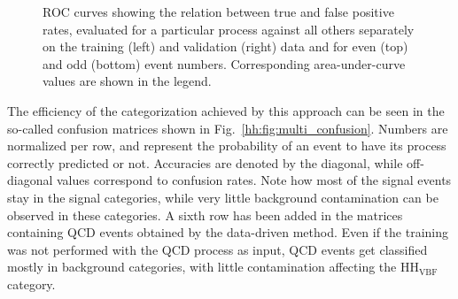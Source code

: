 \documentclass[../main.tex]{subfiles}
\begin{document}
\begin{figure}[h!]
\begin{center}
\end{center}
\caption[Multi-class ROC curves]{ROC curves showing the relation between true and false positive rates, evaluated for a particular process against all others separately on the training (left) and validation (right) data and for even (top) and odd (bottom) event numbers. Corresponding area-under-curve values are shown in the legend.}
\label{hh:fig:multi_roc}
\end{figure}

The efficiency of the categorization achieved by this approach can be seen in the so-called confusion matrices shown in Fig.~\ref{hh:fig:multi_confusion}. Numbers are normalized per row, and represent the probability of an event to have its process correctly predicted or not. Accuracies are denoted by the diagonal, while off-diagonal values correspond to confusion rates. Note how most of the signal events stay in the signal categories, while very little background contamination can be observed in these categories. A sixth row has been added in the matrices containing QCD events obtained by the data-driven method. Even if the training was not performed with the QCD process as input, QCD events get classified mostly in background categories, with little contamination affecting the HH${}_\text{VBF}$ category.
\end{document}
